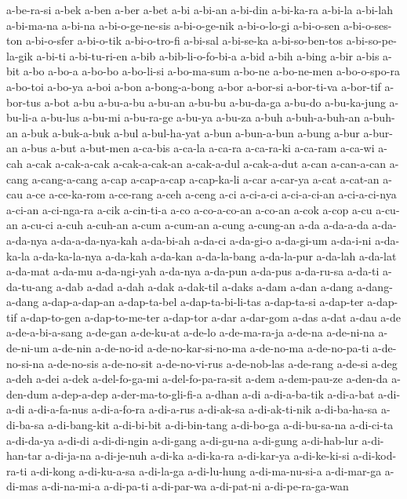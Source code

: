 {a-be-ra-si a-bek a-ben a-ber a-bet a-bi a-bi-an a-bi-din a-bi-ka-ra
a-bi-la a-bi-lah a-bi-ma-na a-bi-na a-bi-o-ge-ne-sis a-bi-o-ge-nik
a-bi-o-lo-gi a-bi-o-sen a-bi-o-ses-ton a-bi-o-sfer a-bi-o-tik
a-bi-o-tro-fi a-bi-sal a-bi-se-ka a-bi-so-ben-tos a-bi-so-pe-la-gik
a-bi-ti a-bi-tu-ri-en a-bib a-bib-li-o-fo-bi-a a-bid a-bih a-bing a-bir
a-bis a-bit a-bo a-bo-a a-bo-bo a-bo-li-si a-bo-ma-sum a-bo-ne a-bo-ne-men
a-bo-o-spo-ra a-bo-toi a-bo-ya a-boi a-bon a-bong-a-bong a-bor a-bor-si
a-bor-ti-va a-bor-tif a-bor-tus a-bot a-bu a-bu-a-bu a-bu-an a-bu-bu
a-bu-da-ga a-bu-do a-bu-ka-jung a-bu-li-a a-bu-lus a-bu-mi a-bu-ra-ge
a-bu-ya a-bu-za a-buh a-buh-a-buh-an a-buh-an a-buk a-buk-a-buk a-bul
a-bul-ha-yat a-bun a-bun-a-bun a-bung a-bur a-bur-an a-bus a-but a-but-men
a-ca-bis a-ca-la a-ca-ra a-ca-ra-ki a-ca-ram a-ca-wi a-cah a-cak
a-cak-a-cak a-cak-a-cak-an a-cak-a-dul a-cak-a-dut a-can a-can-a-can
a-cang a-cang-a-cang a-cap a-cap-a-cap a-cap-ka-li a-car a-car-ya a-cat
a-cat-an a-cau a-ce a-ce-ka-rom a-ce-rang a-ceh a-ceng a-ci a-ci-a-ci
a-ci-a-ci-an a-ci-a-ci-nya a-ci-an a-ci-nga-ra a-cik a-cin-ti-a a-co
a-co-a-co-an a-co-an a-cok a-cop a-cu a-cu-an a-cu-ci a-cuh a-cuh-an a-cum
a-cum-an a-cung a-cung-an a-da a-da-a-da a-da-a-da-nya a-da-a-da-nya-kah
a-da-bi-ah a-da-ci a-da-gi-o a-da-gi-um a-da-i-ni a-da-ka-la
a-da-ka-la-nya a-da-kah a-da-kan a-da-la-bang a-da-la-pur a-da-lah
a-da-lat a-da-mat a-da-mu a-da-ngi-yah a-da-nya a-da-pun a-da-pus
a-da-ru-sa a-da-ti a-da-tu-ang a-dab a-dad a-dah a-dak a-dak-til a-daks
a-dam a-dan a-dang a-dang-a-dang a-dap-a-dap-an a-dap-ta-bel
a-dap-ta-bi-li-tas a-dap-ta-si a-dap-ter a-dap-tif a-dap-to-gen
a-dap-to-me-ter a-dap-tor a-dar a-dar-gom a-das a-dat a-dau a-de
a-de-a-bi-a-sang a-de-gan a-de-ku-at a-de-lo a-de-ma-ra-ja a-de-na
a-de-ni-na a-de-ni-um a-de-nin a-de-no-id a-de-no-kar-si-no-ma a-de-no-ma
a-de-no-pa-ti a-de-no-si-na a-de-no-sis a-de-no-sit a-de-no-vi-rus
a-de-nob-las a-de-rang a-de-si a-deg a-deh a-dei a-dek a-del-fo-ga-mi
a-del-fo-pa-ra-sit a-dem a-dem-pau-ze a-den-da a-den-dum a-dep-a-dep
a-der-ma-to-gli-fi-a a-dhan a-di a-di-a-ba-tik a-di-a-bat a-di-a-di
a-di-a-fa-nus a-di-a-fo-ra a-di-a-rus a-di-ak-sa a-di-ak-ti-nik
a-di-ba-ha-sa a-di-ba-sa a-di-bang-kit a-di-bi-bit a-di-bin-tang
a-di-bo-ga a-di-bu-sa-na a-di-ci-ta a-di-da-ya a-di-di a-di-di-ngin
a-di-gang a-di-gu-na a-di-gung a-di-hab-lur a-di-han-tar a-di-ja-na
a-di-je-nuh a-di-ka a-di-ka-ra a-di-kar-ya a-di-ke-ki-si a-di-kod-ra-ti
a-di-kong a-di-ku-a-sa a-di-la-ga a-di-lu-hung a-di-ma-nu-si-a a-di-mar-ga
a-di-mas a-di-na-mi-a a-di-pa-ti a-di-par-wa a-di-pat-ni a-di-pe-ra-ga-wan
}
